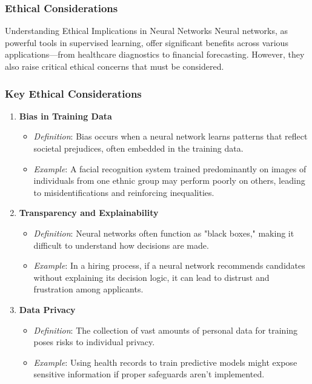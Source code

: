\documentclass[aspectratio=169]{beamer}
\begin{document}
\begin{frame}[fragile]
    \frametitle{Ethical Considerations}
    \begin{block}{Understanding Ethical Implications in Neural Networks}
        Neural networks, as powerful tools in supervised learning, offer significant benefits across various applications—from healthcare diagnostics to financial forecasting. However, they also raise critical ethical concerns that must be considered.
    \end{block}
\end{frame}

\begin{frame}[fragile]
    \frametitle{Key Ethical Considerations}
    \begin{enumerate}
        \item \textbf{Bias in Training Data}
            \begin{itemize} 
                \item \textit{Definition}: Bias occurs when a neural network learns patterns that reflect societal prejudices, often embedded in the training data.
                \item \textit{Example}: A facial recognition system trained predominantly on images of individuals from one ethnic group may perform poorly on others, leading to misidentifications and reinforcing inequalities.
            \end{itemize}
        
        \item \textbf{Transparency and Explainability}
            \begin{itemize} 
                \item \textit{Definition}: Neural networks often function as "black boxes," making it difficult to understand how decisions are made.
                \item \textit{Example}: In a hiring process, if a neural network recommends candidates without explaining its decision logic, it can lead to distrust and frustration among applicants.
            \end{itemize}
    
        \item \textbf{Data Privacy}
            \begin{itemize} 
                \item \textit{Definition}: The collection of vast amounts of personal data for training poses risks to individual privacy.
                \item \textit{Example}: Using health records to train predictive models might expose sensitive information if proper safeguards aren't implemented.
            \end{itemize}
    

\end{enumerate}
\end{frame}
\end{document}
